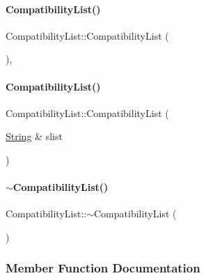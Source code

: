\paragraph{\texorpdfstring{CompatibilityList()}{CompatibilityList()}\hspace{0.1cm}{\footnotesize\ttfamily [1/2]}}
{\footnotesize\ttfamily Compatibility\+List\+::\+Compatibility\+List (\begin{DoxyParamCaption}{ }\end{DoxyParamCaption})\hspace{0.3cm}{\ttfamily [inline]}, {\ttfamily [explicit]}}

\mbox{\label{class_compatibility_list_af34d724919febac11f933a4d42f3d550}} 
\paragraph{\texorpdfstring{CompatibilityList()}{CompatibilityList()}\hspace{0.1cm}{\footnotesize\ttfamily [2/2]}}
{\footnotesize\ttfamily Compatibility\+List\+::\+Compatibility\+List (\begin{DoxyParamCaption}\item[{\mbox{\hyperlink{class_string}{String}} \&}]{slist }\end{DoxyParamCaption})\hspace{0.3cm}{\ttfamily [explicit]}}

\mbox{\label{class_compatibility_list_ac3f2eebda805a5b587c498a4915161fc}} 
\paragraph{\texorpdfstring{$\sim$CompatibilityList()}{~CompatibilityList()}}
{\footnotesize\ttfamily Compatibility\+List\+::$\sim$\+Compatibility\+List (\begin{DoxyParamCaption}{ }\end{DoxyParamCaption})\hspace{0.3cm}{\ttfamily [inline]}}



\subsubsection{Member Function Documentation}
\mbox{\label{class_compatibility_list_a7d9dbeada758ed1fc4849d77058ff69d}} 
